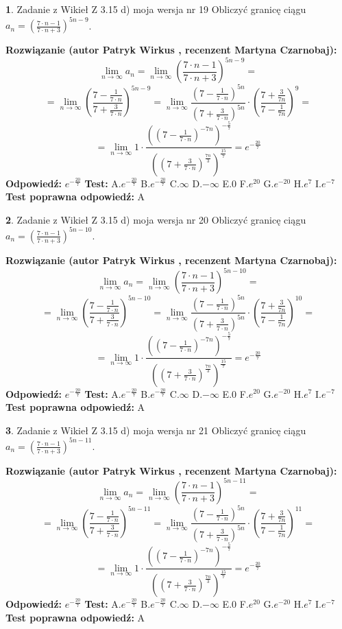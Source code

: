 \documentclass[12pt, a4paper]{article}
\theoremstyle{definition} %
\newtheorem{zad}{}
\newcommand{\zadStart}[1]{\begin{zad}#1\newline}
\newcommand{\zadStop}{\end{zad}}
\newcommand{\rozwStart}[2]{\noindent \textbf{Rozwiązanie (autor #1 , recenzent #2): }\newline}
\newcommand{\rozwStop}{\newline}
\newcommand{\odpStart}{\noindent \textbf{Odpowiedź:}\newline}
\newcommand{\odpStop}{\newline}
\newcommand{\testStart}{\noindent \textbf{Test:}\newline}
\newcommand{\testStop}{\newline}
\newcommand{\kluczStart}{\noindent \textbf{Test poprawna odpowiedź:}\newline}
\newcommand{\kluczStop}{\newline}
\begin{document}
\zadStart{Zadanie z Wikieł Z 3.15 d) moja wersja nr 19}
Obliczyć granicę ciągu $a_{n}=(\frac{7\cdot n - 1}{7 \cdot n + 3})^{5n-9}$.
\zadStop
\rozwStart{Patryk Wirkus}{Martyna Czarnobaj}
$$\lim\limits_{n\to\infty} a_{n} = \lim\limits_{n\to\infty}(\frac{7\cdot n - 1}{7 \cdot n + 3})^{5n-9}=$$
$$=\lim\limits_{n\to\infty}(\frac{7 - \frac{1}{7\cdot n}}{7 + \frac{3}{7 \cdot n}})^{5n-9}=\lim\limits_{n\to\infty}\frac{(7 - \frac{1}{7\cdot n})^{5n}}{(7 + \frac{3}{7\cdot n})^{5n}} \cdot (\frac{7+\frac{3}{7n}}{7-\frac{1}{7n}})^{9}=$$
$$=\lim\limits_{n\to\infty} 1 \cdot \frac{((7-\frac{1}{7 \cdot n})^{-7n})^{-\frac{5}{7}}}{((7+\frac{3}{7 \cdot n})^{\frac{7n}{3}})^{\frac{15}{7}}} =e^{-\frac{20}{7}}$$
\rozwStop
\odpStart
$e^{-\frac{20}{7}}$
\odpStop
\testStart
A.$ e^{-\frac{20}{7}}$
B.$ e^{-\frac{20}{7}}$
C.$\infty$
D.$-\infty$
E.$0$
F.$e^{20}$
G.$e^{-20}$
H.$e^{7}$
I.$e^{-7}$
\testStop
\kluczStart
A
\kluczStop



\zadStart{Zadanie z Wikieł Z 3.15 d) moja wersja nr 20}
Obliczyć granicę ciągu $a_{n}=(\frac{7\cdot n - 1}{7 \cdot n + 3})^{5n-10}$.
\zadStop
\rozwStart{Patryk Wirkus}{Martyna Czarnobaj}
$$\lim\limits_{n\to\infty} a_{n} = \lim\limits_{n\to\infty}(\frac{7\cdot n - 1}{7 \cdot n + 3})^{5n-10}=$$
$$=\lim\limits_{n\to\infty}(\frac{7 - \frac{1}{7\cdot n}}{7 + \frac{3}{7 \cdot n}})^{5n-10}=\lim\limits_{n\to\infty}\frac{(7 - \frac{1}{7\cdot n})^{5n}}{(7 + \frac{3}{7\cdot n})^{5n}} \cdot (\frac{7+\frac{3}{7n}}{7-\frac{1}{7n}})^{10}=$$
$$=\lim\limits_{n\to\infty} 1 \cdot \frac{((7-\frac{1}{7 \cdot n})^{-7n})^{-\frac{5}{7}}}{((7+\frac{3}{7 \cdot n})^{\frac{7n}{3}})^{\frac{15}{7}}} =e^{-\frac{20}{7}}$$
\rozwStop
\odpStart
$e^{-\frac{20}{7}}$
\odpStop
\testStart
A.$ e^{-\frac{20}{7}}$
B.$ e^{-\frac{20}{7}}$
C.$\infty$
D.$-\infty$
E.$0$
F.$e^{20}$
G.$e^{-20}$
H.$e^{7}$
I.$e^{-7}$
\testStop
\kluczStart
A
\kluczStop



\zadStart{Zadanie z Wikieł Z 3.15 d) moja wersja nr 21}
Obliczyć granicę ciągu $a_{n}=(\frac{7\cdot n - 1}{7 \cdot n + 3})^{5n-11}$.
\zadStop
\rozwStart{Patryk Wirkus}{Martyna Czarnobaj}
$$\lim\limits_{n\to\infty} a_{n} = \lim\limits_{n\to\infty}(\frac{7\cdot n - 1}{7 \cdot n + 3})^{5n-11}=$$
$$=\lim\limits_{n\to\infty}(\frac{7 - \frac{1}{7\cdot n}}{7 + \frac{3}{7 \cdot n}})^{5n-11}=\lim\limits_{n\to\infty}\frac{(7 - \frac{1}{7\cdot n})^{5n}}{(7 + \frac{3}{7\cdot n})^{5n}} \cdot (\frac{7+\frac{3}{7n}}{7-\frac{1}{7n}})^{11}=$$
$$=\lim\limits_{n\to\infty} 1 \cdot \frac{((7-\frac{1}{7 \cdot n})^{-7n})^{-\frac{5}{7}}}{((7+\frac{3}{7 \cdot n})^{\frac{7n}{3}})^{\frac{15}{7}}} =e^{-\frac{20}{7}}$$
\rozwStop
\odpStart
$e^{-\frac{20}{7}}$
\odpStop
\testStart
A.$ e^{-\frac{20}{7}}$
B.$ e^{-\frac{20}{7}}$
C.$\infty$
D.$-\infty$
E.$0$
F.$e^{20}$
G.$e^{-20}$
H.$e^{7}$
I.$e^{-7}$
\testStop
\kluczStart
A
\kluczStop
\end{document}
